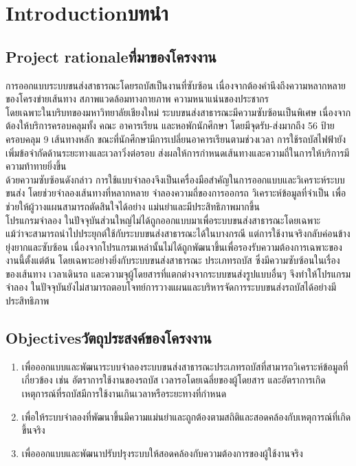 \chapter{\ifenglish Introduction\else บทนำ\fi}

\newenvironment{mypara}{\par\indent}{}

\setlength{\parindent}{2em}

\section{\ifenglish Project rationale\else ที่มาของโครงงาน\fi}
\begin{mypara}
    \indent การออกแบบระบบขนส่งสาธารณะโดยรถบัสเป็นงานที่ซับซ้อน เนื่องจากต้องคำนึงถึงความหลากหลายของโครงข่ายเส้นทาง 
    สภาพแวดล้อมทางกายภาพ ความหนาแน่นของประชากร \\ 
    \indent โดยเฉพาะในบริบทของมหาวิทยาลัยเชียงใหม่ ระบบขนส่งสาธารณะมีความซับซ้อนเป็นพิเศษ 
    เนื่องจากต้องให้บริการครอบคลุมทั้ง คณะ อาคารเรียน และหอพักนักศึกษา โดยมีจุดรับ-ส่งมากถึง 56 ป้าย ครอบคลุม 9 เส้นทางหลัก 
    ขณะที่นักศึกษามีการเปลี่ยนอาคารเรียนตามช่วงเวลา การใช้รถบัสไฟฟ้ายังเพิ่มข้อจำกัดด้านระยะทางและเวลาวิ่งต่อรอบ 
    ส่งผลให้การกำหนดเส้นทางและความถี่ในการให้บริการมีความท้าทายยิ่งขึ้น \\
    \indent ด้วยความซับซ้อนดังกล่าว การใช้แบบจำลองจึงเป็นเครื่องมือสำคัญในการออกแบบและวิเคราะห์ระบบขนส่ง 
    โดยช่วยจำลองเส้นทางที่หลากหลาย จำลองความถี่ของการออกรถ วิเคราะห์ข้อมูลที่จำเป็น เพื่อช่วยให้ผู้วางแผนสามารถตัดสินใจได้อย่าง
    แม่นยำและมีประสิทธิภาพมากขึ้น  \\
    \indent โปรแกรมจำลอง ในปัจจุบันส่วนใหญ่ไม่ได้ถูกออกแบบมาเพื่อระบบขนส่งสาธารณะโดยเฉพาะ \\
    แม้ว่าจะสามารถนำไปประยุกต์ใช้กับระบบขนส่งสาธารณะได้ในบางกรณี แต่การใช้งานจริงกลับค่อนข้างยุ่งยากและซับซ้อน 
    เนื่องจากโปรแกรมเหล่านั้นไม่ได้ถูกพัฒนาขึ้นเพื่อรองรับความต้องการเฉพาะของงานนี้ตั้งแต่ต้น โดยเฉพาะอย่างยิ่งกับระบบขนส่งสาธารณะ
    ประเภทรถบัส ซึ่งมีความซับซ้อนในเรื่องของเส้นทาง เวลาเดินรถ และความจุผู้โดยสารที่แตกต่างจากระบบขนส่งรูปแบบอื่นๆ 
    จึงทำให้โปรแกรมจำลอง ในปัจจุบันยังไม่สามารถตอบโจทย์การวางแผนและบริหารจัดการระบบขนส่งรถบัสได้อย่างมีประสิทธิภาพ
\end{mypara}

\section{\ifenglish Objectives\else วัตถุประสงค์ของโครงงาน\fi}
\begin{enumerate}
    \item เพื่อออกแบบและพัฒนาระบบจำลองระบบขนส่งสาธารณะประเภทรถบัสที่สามารถวิเคราะห์ข้อมูลที่เกี่ยวข้อง เช่น อัตราการใช้งานของรถบัส เวลารอโดยเฉลี่ยของผู้โดยสาร และอัตราการเกิดเหตุการณ์ที่รถบัสมีการใช้งานเกินเวลาหรือระยะทางที่กำหนด
    \item เพื่อให้ระบบจำลองที่พัฒนาขึ้นมีความแม่นยำและถูกต้องตามสถิติและสอดคล้องกับเหตุการณ์ที่เกิดขึ้นจริง 
    \item เพื่อออกแบบและพัฒนาปรับปรุงระบบให้สอดคล้องกับความต้องการของผู้ใช้งานจริง
\end{enumerate}


